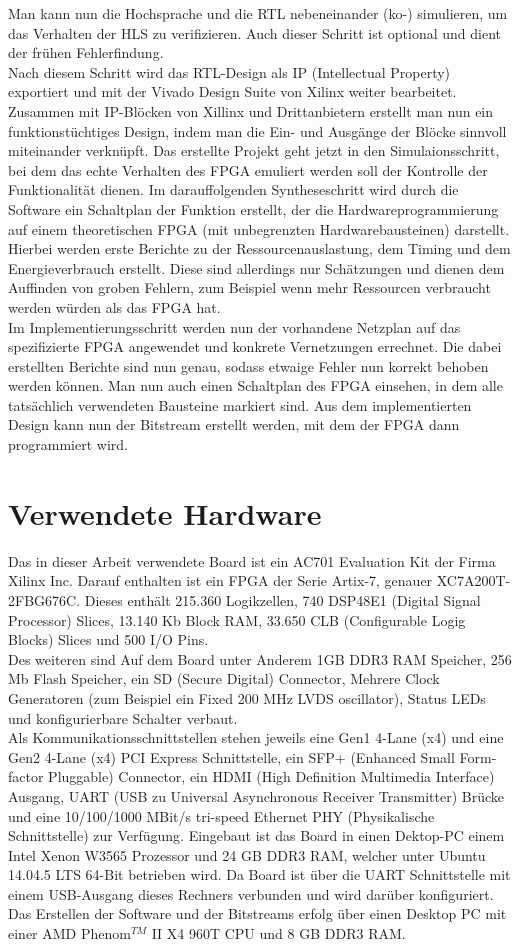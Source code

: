 Man kann nun die Hochsprache und die RTL nebeneinander (ko-) simulieren, um das Verhalten der HLS zu verifizieren. Auch dieser Schritt ist optional und dient der frühen Fehlerfindung. \\
Nach diesem Schritt wird das RTL-Design als IP (Intellectual Property) exportiert und mit der Vivado Design Suite von Xilinx weiter bearbeitet. Zusammen mit IP-Blöcken von Xillinx und Drittanbietern erstellt man nun ein funktionstüchtiges Design, indem man die Ein- und Ausgänge der Blöcke sinnvoll miteinander verknüpft. Das erstellte Projekt geht jetzt in den Simulaionsschritt, bei dem das echte Verhalten des FPGA emuliert werden soll der Kontrolle der Funktionalität dienen. Im darauffolgenden Syntheseschritt wird durch die Software ein Schaltplan der Funktion erstellt, der die Hardwareprogrammierung auf einem theoretischen FPGA (mit unbegrenzten Hardwarebausteinen) darstellt. Hierbei werden erste Berichte zu der Ressourcenauslastung, dem Timing und dem Energieverbrauch erstellt. Diese sind allerdings nur Schätzungen und dienen dem Auffinden von groben Fehlern, zum Beispiel wenn mehr Ressourcen verbraucht werden würden als das FPGA hat.\\
Im Implementierungsschritt werden nun der vorhandene Netzplan auf das spezifizierte FPGA angewendet und konkrete Vernetzungen errechnet. Die dabei erstellten Berichte sind nun genau, sodass etwaige Fehler nun korrekt behoben werden können. Man nun auch einen Schaltplan des FPGA einsehen, in dem alle tatsächlich verwendeten Bausteine markiert sind.
Aus dem implementierten Design kann nun der Bitstream erstellt werden, mit dem der FPGA dann programmiert wird.
\section{Verwendete Hardware}
Das in dieser Arbeit verwendete Board ist ein AC701 Evaluation Kit der Firma Xilinx Inc. Darauf enthalten ist ein FPGA der Serie Artix-7, genauer XC7A200T-2FBG676C. Dieses enthält 215.360 Logikzellen, 740 DSP48E1 (Digital Signal Processor) Slices, 13.140 Kb Block RAM, 33.650 CLB (Configurable Logig Blocks) Slices und 500 I/O Pins.\cite{XIL3}
\\Des weiteren sind Auf dem Board unter Anderem 1GB DDR3 RAM Speicher, 256 Mb Flash Speicher, ein SD (Secure Digital) Connector, Mehrere Clock Generatoren (zum Beispiel ein Fixed 200 MHz LVDS oscillator), Status LEDs und konfigurierbare Schalter verbaut.\\
Als Kommunikationsschnittstellen stehen jeweils eine Gen1 4-Lane (x4) und eine Gen2 4-Lane (x4) PCI Express Schnittstelle, ein SFP+ (Enhanced Small Form-factor Pluggable) Connector, ein HDMI (High Definition Multimedia Interface) Ausgang, UART (USB zu Universal Asynchronous Receiver Transmitter) Brücke und eine 10/100/1000 MBit/s tri-speed Ethernet PHY (Physikalische Schnittstelle) zur Verfügung.\cite{XIL1}\newpage
Eingebaut ist das Board in einen Dektop-PC einem Intel Xenon W3565 Prozessor und 24 GB DDR3 RAM, welcher unter Ubuntu 14.04.5 LTS 64-Bit betrieben wird. Da Board ist über die UART Schnittstelle mit einem USB-Ausgang dieses Rechners verbunden und wird darüber konfiguriert.
Das Erstellen der Software und der Bitstreams erfolg über einen Desktop PC mit einer AMD Phenom$^{TM}$ II X4 960T CPU und 8 GB DDR3 RAM.
